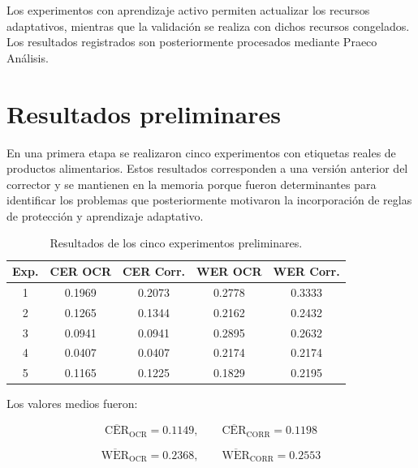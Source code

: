\newpage

Los experimentos con aprendizaje activo permiten actualizar los recursos adaptativos, mientras que la validación se realiza con dichos recursos congelados. Los resultados registrados son posteriormente procesados mediante Praeco Análisis.

\section{Resultados preliminares}

En una primera etapa se realizaron cinco experimentos con etiquetas reales de productos alimentarios. Estos resultados corresponden a una versión anterior del corrector y se mantienen en la memoria porque fueron determinantes para identificar los problemas que posteriormente motivaron la incorporación de reglas de protección y aprendizaje adaptativo.

\begin{table}[htbp]
	\centering
	\caption{Resultados de los cinco experimentos preliminares.}
	\label{tab:resultados-preliminares}
	\vspace{0.2cm}
	\begin{tabular}{ccccc}
		\toprule
		\textbf{Exp.} & \textbf{CER OCR} & \textbf{CER Corr.} & \textbf{WER OCR} & \textbf{WER Corr.} \\
		\midrule
		1 & 0.1969 & 0.2073 & 0.2778 & 0.3333 \\
		2 & 0.1265 & 0.1344 & 0.2162 & 0.2432 \\
		3 & 0.0941 & 0.0941 & 0.2895 & 0.2632 \\
		4 & 0.0407 & 0.0407 & 0.2174 & 0.2174 \\
		5 & 0.1165 & 0.1225 & 0.1829 & 0.2195 \\
		\bottomrule
	\end{tabular}
\end{table}

Los valores medios fueron:

\begin{equation}
	\overline{\mathrm{CER}}_{\mathrm{OCR}}=0.1149,
	\qquad
	\overline{\mathrm{CER}}_{\mathrm{CORR}}=0.1198
\end{equation}

\begin{equation}
	\overline{\mathrm{WER}}_{\mathrm{OCR}}=0.2368,
	\qquad
	\overline{\mathrm{WER}}_{\mathrm{CORR}}=0.2553
\end{equation}

